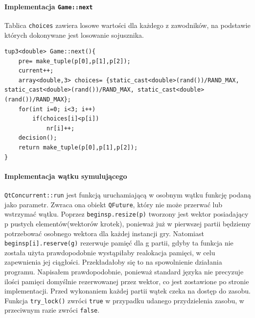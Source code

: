 \paragraph{Implementacja \texttt{Game::next}}
Tablica \texttt{choices} zawiera losowe wartości dla każdego z zawodników, na podstawie których dokonywane jest losowanie sojusznika.
\begin{lstlisting}
tup3<double> Game::next(){
    pre= make_tuple(p[0],p[1],p[2]);
    current++;
    array<double,3> choices= {static_cast<double>(rand())/RAND_MAX, static_cast<double>(rand())/RAND_MAX, static_cast<double>(rand())/RAND_MAX};
    for(int i=0; i<3; i++)
        if(choices[i]<p[i])
            nr[i]++;
    decision();
    return make_tuple(p[0],p[1],p[2]);
}
\end{lstlisting}

\paragraph{Implementacja wątku symulującego} \texttt{QtConcurrent::run} jest funkcją uruchamiającą w osobnym wątku funkcję podaną jako parametr. Zwraca ona obiekt \texttt{QFuture}, który nie może przerwać lub wstrzymać wątku. Poprzez \texttt{beginsp.resize(p)} tworzony jest wektor posiadający p pustych elementów(wektorów krotek), ponieważ już w pierwszej partii będziemy potrzebować osobnego wektora dla każdej instancji gry. Natomiast \texttt{beginsp[i].reserve(g)} rezerwuje pamięć dla g partii, gdyby ta funkcja nie została użyta prawdopodobnie wystąpiłaby realokacja pamięci, w celu zapewnienia jej ciągłości. Przekładałoby się to na spowolnienie działania programu. Napisałem prawdopodobnie, ponieważ standard języka nie precyzuje ilości pamięci domyślnie rezerwowanej przez wektor, co jest zostawione po stronie implementacji. Przed wykonaniem każdej partii wątek czeka na dostęp do zasobu. Funkcja \texttt{try\_lock()} zwróci \texttt{true} w przypadku udanego przydzielenia zasobu, w przeciwnym razie zwróci \texttt{false}. 
